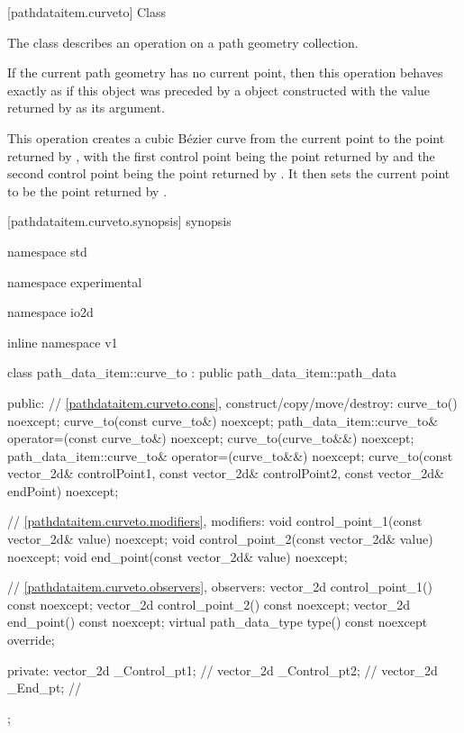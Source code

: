  [pathdataitem.curveto] {Class }

\pnum
{}
The class  describes an operation on a path geometry collection.

\pnum
If the current path geometry has no current point, then this operation behaves exactly as if this object was preceded by a  object constructed with the value returned by  as its argument.

\pnum
This operation creates a cubic B\'ezier curve from the current point to the point returned by , with the first control point being the point returned by  and the second control point being the point returned by . It then sets the current point to be the point returned by .

 [pathdataitem.curveto.synopsis] { synopsis}

\begin{codeblock}
namespace std { namespace experimental { namespace io2d { inline namespace v1 {
  class path_data_item::curve_to : public path_data_item::path_data {
  public:
    // \ref{pathdataitem.curveto.cons}, construct/copy/move/destroy:
    curve_to() noexcept;
    curve_to(const curve_to&) noexcept;
    path_data_item::curve_to& operator=(const curve_to&) noexcept;
    curve_to(curve_to&&) noexcept;
    path_data_item::curve_to& operator=(curve_to&&) noexcept;
    curve_to(const vector_2d& controlPoint1, const vector_2d& controlPoint2,
      const vector_2d& endPoint) noexcept;

    // \ref{pathdataitem.curveto.modifiers}, modifiers:
    void control_point_1(const vector_2d& value) noexcept;
    void control_point_2(const vector_2d& value) noexcept;
    void end_point(const vector_2d& value) noexcept;


    // \ref{pathdataitem.curveto.observers}, observers:
    vector_2d control_point_1() const noexcept;
    vector_2d control_point_2() const noexcept;
    vector_2d end_point() const noexcept;
    virtual path_data_type type() const noexcept override;
    
  private:
    vector_2d _Control_pt1; // \expos
    vector_2d _Control_pt2; // \expos
    vector_2d _End_pt;      // \expos
  };
} } } }
\end{codeblock}

